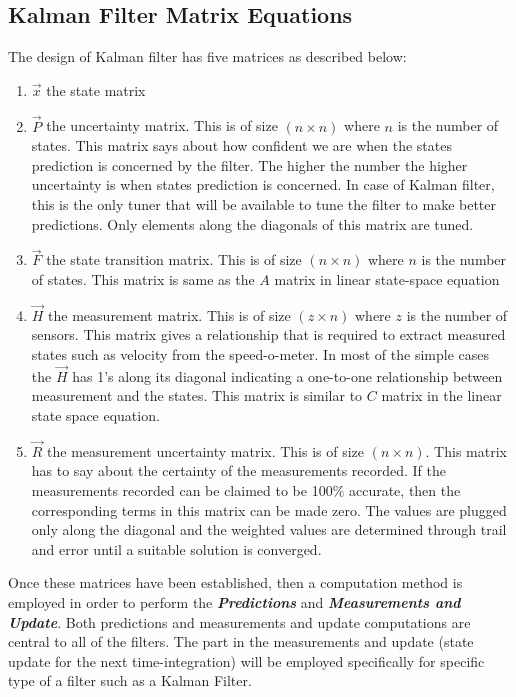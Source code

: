 \subsection{Kalman Filter Matrix Equations}

The design of Kalman filter has five matrices as described below:
\begin{enumerate}
	\item $\vec{x}$ the state matrix
	\item $\vec{P}$ the uncertainty matrix. This is of size $(n \times n)$ where $n$ is the number of states. This matrix says about how confident we are when the states prediction is concerned by the filter. The higher the number the higher uncertainty is when states prediction is concerned. In case of Kalman filter, this is the only tuner that will be available to tune the filter to make better predictions. Only elements along the diagonals of this matrix are tuned.
	\item $\vec{F}$ the state transition matrix. This is of size $(n \times n)$ where $n$ is the number of states. This matrix is same as the $A$ matrix in linear state-space equation 
	\item $\vec{H}$ the measurement matrix. This is of size $(z \times n)$ where $z$ is the number of sensors. This matrix gives a relationship that is required to extract measured states such as velocity from the speed-o-meter. In most of the simple cases the  $\vec{H}$ has 1's along its diagonal indicating a one-to-one relationship between measurement and the states. This matrix is similar to $C$ matrix in the linear state space equation.
	\item $\vec{R}$ the measurement uncertainty matrix. This is of size $(n \times n)$. This matrix has to say about the certainty of the measurements recorded. If the measurements recorded can be claimed to be 100$\%$ accurate, then the corresponding terms in this matrix can be made zero. The values are plugged only along the diagonal and the weighted values are determined through trail and error until a suitable solution is converged.  
\end{enumerate}

Once these matrices have been established, then a computation method is employed in order to perform the \textbf{\textit{Predictions}} and \textbf{\textit{Measurements and Update}}. Both predictions and measurements and update computations are central to all of the filters. The part in the measurements and update (state update for the next time-integration) will be employed specifically for specific type of a filter such as a Kalman Filter. 

